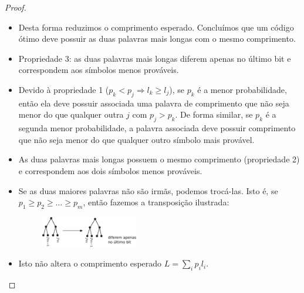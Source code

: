 \begin{frame}[allowframebreaks]
\begin{proof}
\begin{itemize}
\begin{figure}[h!]
         \label{fig:lemmahuffman}
         \end{figure}
  \end{itemize}
  \proofbreak
  \begin{itemize}
  \item Desta forma reduzimos o comprimento esperado. Concluímos que um código ótimo deve possuir as duas
	palavras mais longas com o mesmo comprimento.
  \item Propriedade 3: as duas palavras mais longas diferem apenas no último bit e correspondem aos símbolos menos prováveis.
  \item Devido à propriedade 1 ($p_k < p_j \Rightarrow l_k \geq l_j$), se $p_k$ é a menor probabilidade, então ela deve
	possuir associada uma palavra de comprimento que não seja menor do que qualquer outra $j$ com $p_j > p_k$. 
	De forma similar, se $p_k$ é a segunda menor probabilidade, a palavra associada deve possuir comprimento que não seja
	menor do que qualquer outro símbolo mais provável.
  \end{itemize}
  \proofbreak
  \begin{itemize}
  \item As duas palavras mais longas possuem o mesmo comprimento (propriedade 2) e correspondem aos dois símbolos menos prováveis.
  \item Se as duas maiores palavras não são irmãs, podemos trocá-las. Isto é, se $p_1 \geq p_2 \geq \ldots \geq p_m$, então
	fazemos a transposição ilustrada:
         \begin{figure}[h!]
         \centering
         \includegraphics[width=0.4\textwidth]{images/lemmahuffman2.pdf}
         \label{fig:lemmahuffman2}
         \end{figure}
  \item Isto não altera o comprimento esperado $L = \sum_i p_i l_i$.
  \end{itemize}
  \end{proof}


\end{frame}

